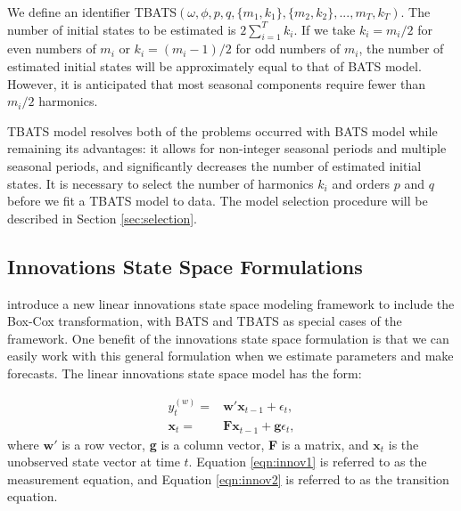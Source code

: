 \documentclass{uwstat572}
\begin{document}
We define an identifier TBATS$( \omega, \phi, p, q, \{m_1,k_1\}, \{m_2,k_2\},...,{m_T,k_T} )$. The number of initial states to be estimated is $2\sum\limits_{i=1}^T k_i$. If we take $k_i=m_i/2$ for even numbers of $m_i$ or $k_i=(m_i-1)/2$ for odd numbers of $m_i$, the number of estimated initial states will be approximately equal to that of BATS model. However, it is anticipated that most seasonal components require fewer than $m_i/2$ harmonics. 

TBATS model resolves both of the problems occurred with BATS model while remaining its advantages: it allows for non-integer seasonal periods and multiple seasonal periods, and significantly decreases the number of estimated initial states. It is necessary to select the number of harmonics $k_i$ and orders $p$ and $q$ before we fit a TBATS model to data. The model selection procedure will be described in Section \ref{sec:selection}.

\subsection{Innovations State Space Formulations}
\hspace{4ex}\citet{de2011forecasting} introduce a new linear innovations state space modeling framework to include the Box-Cox transformation, with BATS and TBATS as special cases of the framework. One benefit of the innovations state space formulation is that we can easily work with this general formulation when we estimate parameters and make forecasts. The linear innovations state space model has the form:

\begin{subequations}
\begin{align}
y_t^{  (w)}=&\textbf{w}'\textbf{x}_{t-1}+\epsilon_t, \label{eqn:innov1}\\
\textbf{x}_t=&\textbf{Fx}_{t-1}+\textbf{g}\epsilon_t, \label{eqn:innov2}
\end{align}
\end{subequations}
\noindent where $\textbf{w}'$ is a row vector, \textbf{g} is a column vector, \textbf{F} is a matrix, and $\textbf{x}_t$ is the unobserved state vector at time $t$. Equation \ref{eqn:innov1} is referred to as the measurement equation, and Equation \ref{eqn:innov2} is referred to as the transition equation.
\end{document}
